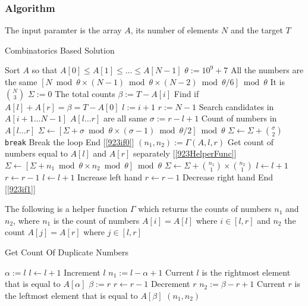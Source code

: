 \subsubsection{Algorithm}
The input paramter is the array $A$, its number of elements $N$ and the target $T$
\setcounter{algorithm}{0}
\begin{algorithm}[H]
\caption{Combinatorics Based Solution}
\begin{algorithmic}[1]
\State Sort $A$ so that $A[0]\leq A[1] \leq \ldots \leq A[N-1]$
\State $\theta := 10^9 + 7$
 \Comment All the numbers are the same
\State \Return $\left[N \bmod \theta \times (N-1)\bmod \theta \times (N-2) \bmod \theta / 6\right] \bmod \theta$ \Comment It is $\binom{N}{3}$
\EndIf
\State $\Sigma:=0$ \Comment The total counts
\State $\beta := T - A[i]$ \Comment Find if $A[l] + A[r] = \beta = T - A[0]$
\State $l:=i+1$
\State $r:=N-1$
 \Comment Search candidates in $A[i+1 \ldots N-1]$
 \label{923if1}
 \Comment $A[l\ldots r]$ are all same \label{923if0}
\State $\sigma := r-l+1$ \Comment Count of numbers in $A[l\ldots r]$
\State $\Sigma \gets \left[\Sigma + \sigma \bmod \theta \times (\sigma -1) \bmod \theta / 2\right] \bmod \theta$ \Comment $\Sigma \gets \Sigma + \binom{\sigma}{2}$
\State \texttt{break} \Comment Break the loop
\EndIf \Comment End [\ref{923if0}]
\State $(n_1, n_2) := \Gamma(A, l, r)$ \Comment Get count of numbers equal to $A[l]$ and $A[r]$ separately [\ref{923HelperFunc}]
\State $\Sigma \gets \left[\Sigma + n_1 \bmod \theta \times n_2 \bmod \theta\right] \bmod \theta$ \Comment $\Sigma \gets \Sigma + \binom{n_1}{1} \times \binom{n_2}{1}$
\State $l \gets l+1$
\State $r \gets r-1$
\State $l \gets l+1$ \Comment Increase left hand
\Else
\State $r \gets r-1$ \Comment Decrease right hand
\EndIf \Comment End [\ref{923if1}]
\EndWhile
\EndFor
\EndProcedure
\end{algorithmic}
\end{algorithm}
The following is a helper function $\Gamma$ which returns the counts of numbers $n_1$ and $n_2$, where $n_1$ is the count of numbers $A[i] = A[l]$ where $i \in [l, r]$ and $n_2$ the count $A[j] = A[r]$ where $j \in [l, r]$
\begin{algorithm}[H]
\caption{Get Count Of Duplicate Numbers}
\label{923HelperFunc}
\begin{algorithmic}[1]
\State $\alpha := l$
\State $l\gets l+1$ \Comment Increment $l$
\EndWhile
\State $n_1:= l - \alpha + 1$ \Comment Current $l$ is the rightmost element that is equal to $A[\alpha]$
\State $\beta := r$
\State $r\gets r-1$ \Comment Decrement $r$
\EndWhile
\State $n_2:= \beta -r +1$ \Comment Current $r$ is the leftmost element that is equal to $A[\beta]$
\State \Return $(n_1, n_2)$
\EndFunction
\end{algorithmic}
\end{algorithm}


